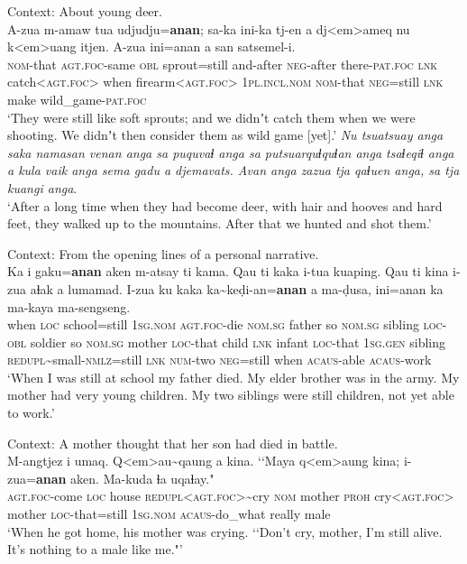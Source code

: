 \begin{exe}
	\ex\label{exAppendixPaiwan1}
	Context: About young deer.\\
	\gll A-zua m-amaw tua udjudju=\textbf{anan}; sa-ka ini-ka tj-en a dj<em>ameq nu k<em>uang itjen. A-zua ini=anan a san satsemel-i. \\
	\textsc{nom}-that \textsc{agt}.\textsc{foc}-same \textsc{obl} sprout=still and-after \textsc{neg}-after there-\textsc{pat}.\textsc{foc} \textsc{lnk} catch<\textsc{agt}.\textsc{foc}> when firearm<\textsc{agt}.\textsc{foc}> 1\textsc{pl}.\textsc{incl}.\textsc{nom} \textsc{nom}-that \textsc{neg}=still \textsc{lnk} make wild\_game-\textsc{pat}.\textsc{foc}\\
	\glt \lq They were still like soft sprouts; and we didnʼt catch them when we were shooting. We didnʼt then consider them as wild game [yet].'
	\exi{} \textit{Nu tsuatsuay anga saka namasan venan anga sa puquvaɬ anga sa putsuarquɬquɬan anga tsaɬeqiɬ anga a kula vaik anga sema gadu a djemavats. Avan anga zazua tja qaɬuen anga, sa tja kuangi anga}.\\
	\lq After a long time when they had become deer, with hair and hooves and hard feet, they walked up to the mountains. After that we hunted and shot them.' \parencite[170–171]{EarlyWhitehorn2003}
	
 	\ex\label{exAppendixPaiwan3}
	Context: From the opening lines of a personal narrative.\\
	\gll Ka i gaku=\textbf{anan} aken m-atsay ti kama. Qau ti kaka i-tua kuaping. Qau ti kina i-zua aɬak a lumamad.	 I-zua ku kaka ka\sim{}keḍi-an=\textbf{anan} a ma-ḍusa, ini=anan ka ma-kaya ma-sengseng.\\
	when \textsc{loc} school=still 1\textsc{sg}.\textsc{nom}  \textsc{agt}.\textsc{foc}-die  \textsc{nom}.\textsc{sg} father so \textsc{nom}.\textsc{sg} sibling \textsc{loc}-\textsc{obl} soldier so \textsc{nom}.\textsc{sg} mother \textsc{loc}-that child \textsc{lnk} infant \textsc{loc}-that 1\textsc{sg}.\textsc{gen} sibling \textsc{redupl}\sim{}small-\textsc{nmlz}=still \textsc{lnk} \textsc{num}-two \textsc{neg}=still when \textsc{acaus}-able \textsc{acaus}-work\\
\glt \lq When I was still at school my father died. My elder brother was in the army. My mother had very young children. My two siblings were still children, not yet able to work.' \parencite[365–366]{EarlyWhitehorn2003}

	 \ex\label{exAppendixPaiwan4}
	Context: A mother thought that her son had died in battle.\\
	\gll M-angtjez i umaq. Q<em>au\sim{}qaung a kina. \lq\lq Maya q<em>aung kina; i-zua=\textbf{anan} aken. Ma-kuda ɬa uqaɬay."\\
	\textsc{agt}.\textsc{foc}-come \textsc{loc} house \textsc{redupl}<\textsc{agt}.\textsc{foc}>\sim{}cry \textsc{nom} mother \phantom{\lq\lq}\textsc{proh} cry<\textsc{agt}.\textsc{foc}> mother \textsc{loc}-that=still 1\textsc{sg}.\textsc{nom} \textsc{acaus}-do\_what really male\\
	\glt \lq When he got home, his mother was crying. \lq\lq Don’t cry, mother, I’m still alive. It’s nothing to a male like me."' \parencite[206]{EarlyWhitehorn2003}


\end{exe}
